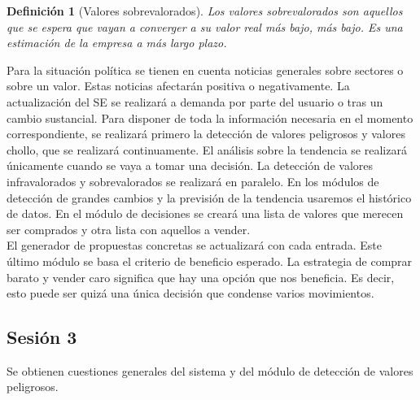 \documentclass[11pt,leqno]{article}
\theoremstyle{definition_wo_parentheses}
\newtheorem{definicion}{Definición}[subsection]
\theoremstyle{plain}
\theoremstyle{remark}
\begin{document}
	\begin{definicion}[Valores sobrevalorados] 
		Los valores sobrevalorados son aquellos que se espera que vayan a converger a su valor real más bajo, más bajo. Es una estimación de la empresa a más largo plazo. 
	\end{definicion}
	
	Para la situación política se tienen en cuenta noticias generales sobre sectores o sobre un valor. Estas noticias afectarán positiva o negativamente. La actualización del SE se realizará a demanda por parte del usuario o tras un cambio sustancial. Para disponer de toda la información necesaria en el momento correspondiente, se realizará primero la detección de valores peligrosos y valores chollo, que se realizará continuamente. El análisis sobre la tendencia se realizará únicamente cuando se vaya a tomar una decisión. La detección de valores infravalorados y sobrevalorados se realizará en paralelo. En los módulos de detección de grandes cambios y la previsión de la tendencia usaremos el histórico de datos. En el módulo de decisiones se creará una lista de valores que merecen ser comprados y otra lista con aquellos a vender.\\
	
	El generador de propuestas concretas se actualizará con cada entrada. Este último módulo se basa el criterio de beneficio esperado. La estrategia de comprar barato y vender caro significa que hay una opción que nos beneficia. Es decir, esto puede ser quizá una única decisión que condense varios movimientos.
		
\subsection{Sesión 3}

	Se obtienen cuestiones generales del sistema y del módulo de detección de valores peligrosos.	
	
\end{document}

